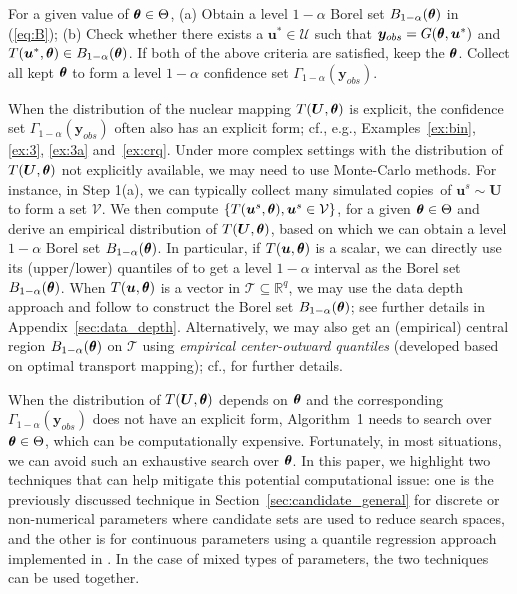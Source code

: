\documentclass[12pt]{article}
\theoremstyle{shortspace}
\def\*#1{\bm{#1}}
\def\btheta{\mathop{\theta\kern-.45em\hbox{$\theta$}}\nolimits}
\newcommand{\RR}{\mathbb{R}}
\begin{document}
\vspace{2mm}
\begin{algorithm}
[ht] \caption{A generic implementation  algorithm}
\label{alg:Ag} %
\begin{algorithmic}[1] 
\State For a given value of $\btheta \in \Theta$, (a) Obtain 
a level $1 - \alpha$ Borel set $B_{1 -\alpha}(\btheta)$ in (\ref{eq:B});  
 (b) Check whether there exists a $\*u^* \in {\mathcal U}$ such that 
${\*y_{obs}} = G({\btheta}, \*u^*)$ and $T(\*u^*, \btheta)  \in B_{1 - \alpha}(\btheta)$. If both of the above criteria are satisfied, keep the $\btheta$.
\State Collect all kept $\btheta$ to form a level $1 - \alpha$ confidence set $\Gamma_{1-\alpha}(\*y_{obs})$. 
\end{algorithmic}
\end{algorithm}
\noindent
When the distribution of the nuclear mapping $T({\*U}, \btheta)$ is explicit, the confidence set $\Gamma_{1-\alpha}(\*y_{obs})$ often also has an explicit form; cf., e.g., Examples~\ref{ex:bin}, \ref{ex:3}, \ref{ex:3a} and~\ref{ex:crq}. 
Under more complex settings with the distribution of $T({\*U}, \btheta)$ not explicitly available, we may need to use Monte-Carlo methods. For instance, 
in Step 1(a),
we can typically collect many simulated copies~of  ${\*u^s} \sim \*U$ to form a set ${\mathcal V}$.
We then compute  $\{T({\*u^s}, \btheta), {\*u^s} \in {\mathcal V}\}$, for a given $\btheta \in \Theta$ and derive an empirical distribution of $T(\*U, \btheta)$, based on which we can obtain a level $1 - \alpha$ Borel set $B_{1 -\alpha}(\btheta)$. 
In particular, 
if $T(\*u, {\btheta})$ is a scalar, we can directly 
use its (upper/lower) quantiles of 
to get a level $1 - \alpha$ interval as the Borel set $B_{1 - \alpha}({\btheta})$. 
When $T(\*u, {\btheta})$ is a vector in ${\mathcal T} \subseteq \RR^q$,
we may use the data depth approach 
and follow \citet[][\S 3.2.2]{Liu2021}
to construct 
the Borel set $B_{1 - \alpha}({\btheta})$; see further details in Appendix~\ref{sec:data_depth}. Alternatively, we may also get an (empirical) central region 
$B_{1 -\alpha}({\btheta})$ on ${\mathcal T}$ using  {\it empirical center-outward quantiles} (developed based on optimal transport mapping); cf.,  \cite{hallin2021distribution} for further details.

 When the distribution of $T(\*U, \btheta)$ depends on $\btheta$ and the corresponding $\Gamma_{1-\alpha}(\*y_{obs})$ does not have an explicit form, Algorithm~1 needs to search over $\btheta \in \Theta$, which can be computationally expensive.
Fortunately, in most situations, we can avoid such an exhaustive search over $\btheta$.  
In this paper, we highlight two techniques that can help mitigate this potential computational issue: one is the previously discussed technique in Section~\ref{sec:candidate_general} for discrete or non-numerical parameters where candidate sets are used to reduce search spaces, and the other is for continuous parameters using a quantile regression approach implemented in \cite{dalmasso2022}. In the case of mixed types of parameters, the two techniques can be used together.  
\end{document}
